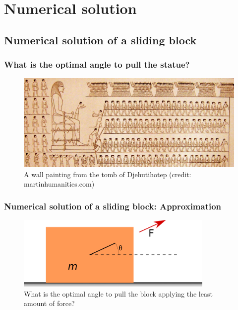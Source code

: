 \documentclass[notes]{beamer}
\begin{document}
\section{Numerical solution}
\subsection{Numerical solution of a sliding block}
\begin{frame}
	\frametitle{What is the optimal angle to pull the statue?}
	\begin{figure}[ht]
		\centering
		\includegraphics[width=\textwidth]{figs/egypt-pyramid.jpg}
		\caption*{A wall painting from the tomb of Djehutihotep (credit: martinhumanities.com)}
	\end{figure}
\end{frame}

\begin{frame}
	\frametitle{Numerical solution of a sliding block: Approximation}
	\begin{figure}[ht]
		\centering
		\includegraphics[width=0.85\textwidth]{figs/sliding-block.png}
		\caption*{What is the optimal angle to pull the block applying the least amount of force?}
	\end{figure}
\end{frame}
\end{document}
